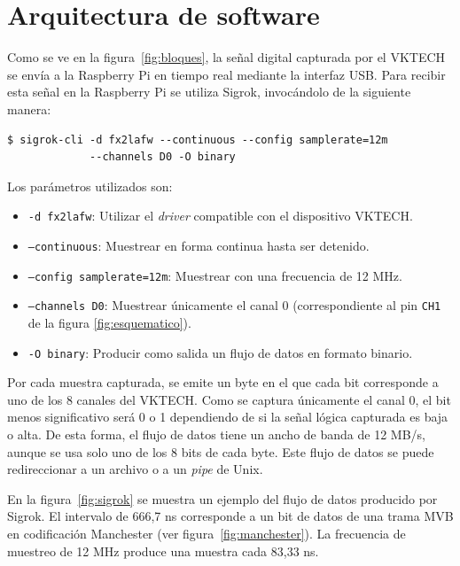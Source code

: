 \section{Arquitectura de software}
\label{sec:software}

Como se ve en la figura~\ref{fig:bloques}, la señal digital capturada por el VKTECH se envía a la Raspberry Pi en tiempo real mediante la interfaz USB. Para recibir esta señal en la Raspberry Pi se utiliza Sigrok, invocándolo de la siguiente manera:

\begin{lstlisting}[basicstyle=\small,breaklines=true,backgroundcolor=\color{light-gray}]
$ sigrok-cli -d fx2lafw --continuous --config samplerate=12m
             --channels D0 -O binary
\end{lstlisting}

Los parámetros utilizados son:

\begin{itemize}
        \item \texttt{-d fx2lafw}: Utilizar el \textit{driver} compatible con el dispositivo VKTECH.
        \item \texttt{--continuous}: Muestrear en forma continua hasta ser detenido.
        \item \texttt{--config samplerate=12m}: Muestrear con una frecuencia de 12 MHz.
        \item \texttt{--channels D0}: Muestrear únicamente el canal 0 (correspondiente al pin \texttt{CH1} de la figura \ref{fig:esquematico}).
        \item \texttt{-O binary}: Producir como salida un flujo de datos en formato binario.
\end{itemize}

Por cada muestra capturada, se emite un byte en el que cada bit corresponde a uno de los 8 canales del VKTECH.
Como se captura únicamente el canal 0, el bit menos significativo será 0 o 1 dependiendo de si la señal lógica capturada es baja o alta.
De esta forma, el flujo de datos tiene un ancho de banda de 12 MB/s, aunque se usa solo uno de los 8 bits de cada byte.
Este flujo de datos se puede redireccionar a un archivo o a un \textit{pipe} de Unix.

En la figura~\ref{fig:sigrok} se muestra un ejemplo del flujo de datos producido por Sigrok. El intervalo de 666,7 ns corresponde a un bit de datos de una trama MVB en codificación Manchester (ver figura~\ref{fig:manchester}). La frecuencia de muestreo de 12 MHz produce una muestra cada 83,33 ns.

